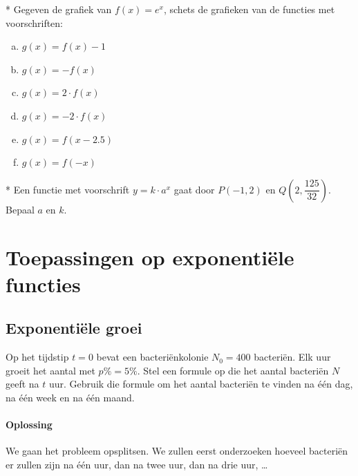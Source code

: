 \documentclass[12pt,twoside,a4paper]{article}
\begin{document}
\begin{oefening}*
Gegeven de grafiek van $f(x)=e^x$, schets de grafieken van de functies met voorschriften:
\begin{multicols}{3}
\begin{enumerate}[(a)]
  \itemsep1em
  \item $g(x)=f(x)-1$
  \item $g(x)=-f(x)$
  \item $g(x)=2\cdot f(x)$
  \item $g(x)=-2\cdot f(x)$
  \item $g(x)=f(x-2.5)$
  \item $g(x)=f(-x)$
\end{enumerate}
\end{multicols}
\end{oefening}

\begin{oefening}*
Een functie met voorschrift $y=k\cdot a^x$ gaat door $P(-1,2)$ en $Q(2,\dfrac{125}{32})$. Bepaal $a$ en $k$.
\end{oefening}

\cleardoublepage
\section{Toepassingen op exponentiële functies}

\subsection{Exponentiële groei}

Op het tijdstip $t=0$ bevat een bacteriënkolonie $N_0=400$ bacteriën. Elk uur groeit het aantal met $p\%=5\%$. Stel een formule op die het aantal bacteriën $N$ geeft na $t$ uur. Gebruik die formule om het aantal bacteriën te vinden na één dag, na één week en na één maand.

\paragraph*{Oplossing}
We gaan het probleem opsplitsen. We zullen eerst onderzoeken hoeveel bacteriën er zullen zijn na één uur, dan na twee uur, dan na drie uur, \ldots
\end{document}
